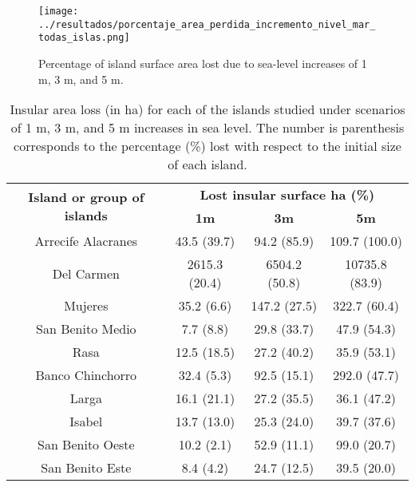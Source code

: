 \documentclass{article} %
\begin{document}
\begin{figure}
  \begin{center}
  \texttt{[image: ../resultados/porcentaje\_area\_perdida\_incremento\_nivel\_mar\_todas\_islas.png]}
  \caption{Percentage of island surface area lost due to sea-level increases of 1 m, 3 m, and 5 m.}
  \label{fig:surface}
  \end{center}
\end{figure}


\begin{table}
\caption{Insular area loss (in ha) for each of the islands studied under scenarios of 1 m, 3 m, and 5 m increases in sea level. The number is parenthesis corresponds to the percentage (\%) lost with respect to the initial size of each island.}
\vspace{2mm}
\begin{center}
\begin{tabular}{cccc}
\hline 
\multirow{2}{*}{\textbf{Island or group of islands}} & \multicolumn{3}{c}{\textbf{Lost insular surface ha (\%)}}\\ 
 & \textbf{1m} & \textbf{3m} & \textbf{5m} \\ 
\hline 
Arrecife Alacranes & 43.5 (39.7) & 94.2 (85.9) & 109.7 (100.0) \\ 

Del Carmen & 2615.3 (20.4) & 6504.2 (50.8) & 10735.8 (83.9) \\ 

Mujeres & 35.2 (6.6) & 147.2 (27.5) & 322.7 (60.4) \\ 
 
San Benito Medio & 7.7 (8.8) & 29.8 (33.7) & 47.9 (54.3) \\ 

Rasa & 12.5 (18.5) & 27.2 (40.2) & 35.9 (53.1) \\ 

Banco Chinchorro & 32.4 (5.3) & 92.5 (15.1) & 292.0 (47.7) \\ 

Larga & 16.1 (21.1) & 27.2 (35.5) & 36.1 (47.2) \\ 

Isabel & 13.7 (13.0) & 25.3 (24.0) & 39.7 (37.6) \\ 

San Benito Oeste & 10.2 (2.1) & 52.9 (11.1) & 99.0 (20.7) \\ 

San Benito Este & 8.4 (4.2) & 24.7 (12.5) & 39.5 (20.0) \\ 


\end{tabular}
\end{center}
\end{table}
\end{document}
